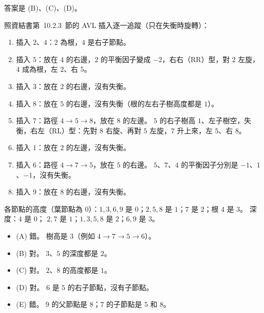 \begin{pastsoln}
答案是 (B)、(C)、(D)。

照資結書第~10.2.3~節的 AVL 插入逐一追蹤（只在失衡時旋轉）：
\begin{enumerate}
\item 插入 $2$、$4$：$2$ 為根，$4$ 是右子節點。
\item 插入 $5$：放在 $4$ 的右邊，$2$ 的平衡因子變成 $-2$，右右（RR）型，對 $2$ 左旋，$4$ 成為根，左 $2$、右 $5$。
\item 插入 $3$：放在 $2$ 的右邊，沒有失衡。
\item 插入 $8$：放在 $5$ 的右邊，沒有失衡（根的左右子樹高度都是 $1$）。
\item 插入 $7$：路徑 $4 \to 5 \to 8$，放在 $8$ 的左邊。 $5$ 的右子樹高 $1$、左子樹空，失衡，右左（RL）型：先對 $8$ 右旋、再對
$5$ 左旋，$7$ 升上來，左 $5$、右 $8$。
\item 插入 $1$：放在 $2$ 的左邊，沒有失衡。
\item 插入 $6$：路徑 $4 \to 7 \to 5$，放在 $5$ 的右邊。 $5$、$7$、$4$ 的平衡因子分別是 $-1$、$1$、$-1$，沒有失衡。
\item 插入 $9$：放在 $8$ 的右邊，沒有失衡。
\end{enumerate}
\begin{center}
\end{center}
各節點的高度（葉節點為 $0$）：$1, 3, 6, 9$ 是 $0$；$2, 5, 8$ 是 $1$；$7$ 是 $2$；根 $4$ 是 $3$。 深度：$4$ 是 $0$；
$2, 7$ 是 $1$；$1, 3, 5, 8$ 是 $2$；$6, 9$ 是 $3$。
\begin{itemize}
\item (A) 錯。 樹高是 $3$（例如 $4 \to 7 \to 5 \to 6$）。
\item (B) 對。 $3$、$5$ 的深度都是 $2$。
\item (C) 對。 $2$、$8$ 的高度都是 $1$。
\item (D) 對。 $6$ 是 $5$ 的右子節點，沒有子節點。
\item (E) 錯。 $9$ 的父節點是 $8$；$7$ 的子節點是 $5$ 和 $8$。
\end{itemize}
\end{pastsoln}

